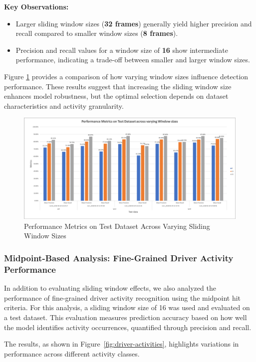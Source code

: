 \documentclass{article}
\begin{document}
\textbf{Key Observations:}
\begin{itemize}
    \item Larger sliding window sizes (\textbf{32 frames}) generally yield higher precision and recall compared to smaller window sizes (\textbf{8 frames}).
    \item Precision and recall values for a window size of \textbf{16} show intermediate performance, indicating a trade-off between smaller and larger window sizes.
\end{itemize}

Figure \ref{fig:metrics} provides a comparison of how varying window sizes influence detection performance. These results suggest that increasing the sliding window size enhances model robustness, but the optimal selection depends on dataset characteristics and activity granularity.

\begin{figure}[ht]
    \centering
    \includegraphics[width=\linewidth]{figs/metrics.png}
    \caption{Performance Metrics on Test Dataset Across Varying Sliding Window Sizes}
    \label{fig:metrics}
\end{figure}

\subsubsection{Midpoint-Based Analysis: Fine-Grained Driver Activity Performance}

In addition to evaluating sliding window effects, we also analyzed the performance of fine-grained driver activity recognition using the midpoint hit criteria. For this analysis, a sliding window size of 16 was used and evaluated on a test dataset.
This evaluation measures prediction accuracy based on how well the model identifies activity occurrences, quantified through precision and recall.

The results, as shown in Figure~\ref{fig:driver-activities}, highlights variations in performance across different activity classes.
\end{document}
